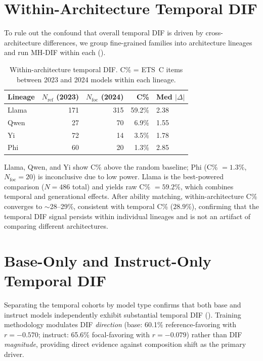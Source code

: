 \section{Within-Architecture Temporal DIF}
\label{app:within_arch}

To rule out the confound that overall temporal DIF is driven by cross-architecture differences, we group fine-grained families into architecture lineages and run MH-DIF within each ().

\begin{table}[h]
\centering
\caption{Within-architecture temporal DIF. C\% = ETS~C items between 2023 and 2024 models within each lineage.}
\label{tab:within_arch}
\small
\begin{tabular}{lrrrl}
\toprule
Lineage & $N_{\mathrm{ref}}$ (2023) & $N_{\mathrm{foc}}$ (2024) & C\% & Med $|\Delta|$ \\
\midrule
Llama & 171 & 315 & 59.2\% & 2.38 \\
Qwen & 27 & 70 & 6.9\% & 1.55 \\
Yi & 72 & 14 & 3.5\% & 1.78 \\
Phi & 60 & 20 & 1.3\% & 2.85 \\
\bottomrule
\end{tabular}
\end{table}

Llama, Qwen, and Yi show C\% above the random baseline; Phi (C\% $= 1.3\%$, $N_{\mathrm{foc}} = 20$) is inconclusive due to low power. Llama is the best-powered comparison ($N = 486$ total) and yields raw C\% $= 59.2\%$, which combines temporal and generational effects. After ability matching, within-architecture C\% converges to ${\sim}$28--29\%, consistent with temporal C\% ($28.9\%$), confirming that the temporal DIF signal persists within individual lineages and is not an artifact of comparing different architectures.

\section{Base-Only and Instruct-Only Temporal DIF}
\label{app:baseinst_temporal}

Separating the temporal cohorts by model type confirms that both base and instruct models independently exhibit substantial temporal DIF (). Training methodology modulates DIF \emph{direction} (base: 60.1\% reference-favoring with $r = -0.570$; instruct: 65.6\% focal-favoring with $r = -0.079$) rather than DIF \emph{magnitude}, providing direct evidence against composition shift as the primary driver.

